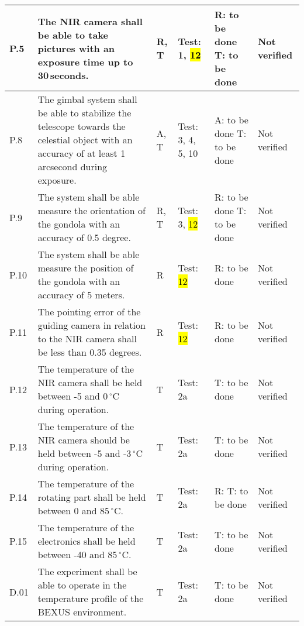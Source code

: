 \begin{longtable}[]{|m{}| m{}|m{}|m{}|m{}|m{}|}
P.5 & The NIR camera shall be able to take pictures with an exposure time up to 30\,seconds.
& R, T & Test: 1, \hl{12} & R: to be done \newline T: to be done & Not verified \\\hline

\rowcolor{yellow} P.8 & The gimbal system shall be able to stabilize the telescope towards the celestial object with an accuracy of at least 1 arcsecond during exposure.
& A, T & Test: 3, 4, 5, 10 & A: to be done \newline T: to be done & Not verified \\\hline

\rowcolor{yellow} P.9 & The system shall be able measure the orientation of the gondola with an accuracy of 0.5 degree.
& R, T & Test: 3, \hl{12} & R: to be done \newline T: to be done  & Not verified \\\hline

\rowcolor{yellow} P.10 & The system shall be able measure the position of the gondola with an accuracy of 5 meters.
& R & Test: \hl{12} & R: to be done & Not verified \\\hline

\rowcolor{yellow} P.11 & The pointing error of the guiding camera in relation to the NIR camera shall be less than 0.35 degrees.
& R & Test: \hl{12} & R: to be done & Not verified \\\hline

\rowcolor{yellow} P.12 & The temperature of the NIR camera shall be held between -5 and 0\,$^\circ$C during operation.
& T & Test: 2a & T: to be done & Not verified \\\hline

\rowcolor{yellow} P.13 & The temperature of the NIR camera should be held between -5 and -3\,$^\circ$C during operation.
& T & Test: 2a &  T: to be done & Not verified \\\hline

\rowcolor{yellow} P.14 & The temperature of the rotating part shall be held between 0 and 85\,$^\circ$C.
& T & Test: 2a & R: T: to be done & Not verified \\\hline

\rowcolor{yellow} P.15 & The temperature of the electronics shall be held between -40 and 85\,$^\circ$C.
& T & Test: 2a & T: to be done & Not verified \\\hline



D.01 & The experiment shall be able to operate in the temperature profile of the BEXUS environment.
& T & Test: 2a & T: to be done & Not verified \\\hline


\end{longtable}
